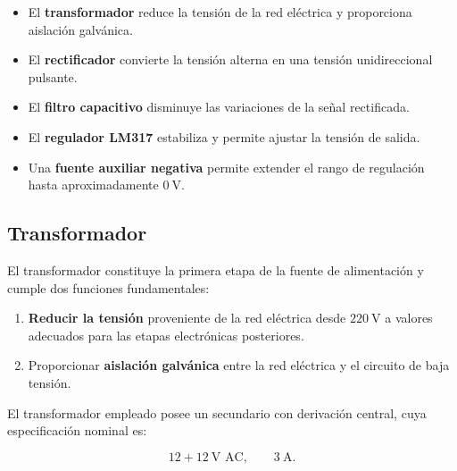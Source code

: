 \documentclass[12pt,a4paper]{article}
\begin{document}
	\begin{itemize}
		
		\item El \textbf{transformador} reduce la tensión de la red eléctrica y
		proporciona aislación galvánica.
		
		\item El \textbf{rectificador} convierte la tensión alterna en una tensión
		unidireccional pulsante.
		
		\item El \textbf{filtro capacitivo} disminuye las variaciones de la señal
		rectificada.
		
		\item El \textbf{regulador LM317} estabiliza y permite ajustar la tensión
		de salida.
		
		\item Una \textbf{fuente auxiliar negativa} permite extender el rango de
		regulación hasta aproximadamente $0~\text{V}$.
		
	\end{itemize}
	
	\subsection{Transformador}
	
	El transformador constituye la primera etapa de la fuente de alimentación y
	cumple dos funciones fundamentales:
	
	\begin{enumerate}
		
		\item \textbf{Reducir la tensión} proveniente de la red eléctrica desde
		$220~\text{V}$ a valores adecuados para las etapas electrónicas posteriores.
		
		\item Proporcionar \textbf{aislación galvánica} entre la red eléctrica y
		el circuito de baja tensión.
		
	\end{enumerate}
	
	El transformador empleado posee un secundario con derivación central, cuya
	especificación nominal es:
	
	\begin{equation}
		12+12~\text{V AC},
		\qquad
		3~\text{A}.
	\end{equation}
	
\end{document}
